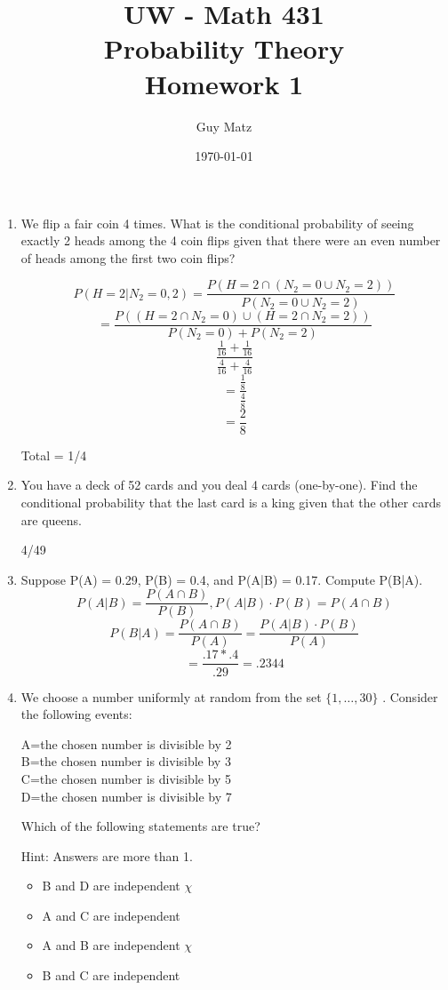 \documentclass[10pt]{article}
\title{UW - Math 431 \\
Probability Theory \\
Homework 1}
\author{Guy Matz}
\date{\today}
\begin{document}
\begin{enumerate}

  \item We flip a fair coin 4 times. What is the conditional probability of seeing exactly 2 heads among the 4 coin flips given that there were an even number of heads among the first two coin flips?

  \[ P(H=2 | N_2 = {0,2}) = \frac{P(H=2 \cap (N_2 = 0 \cup N_2 = 2))}{P(N_2 = 0 \cup N_2 = 2)} \]
  \[  = \frac{P((H=2 \cap N_2 = 0) \cup (H=2 \cap N_2 = 2))}{P(N_2 = 0) + P(N_2 = 2)} \]
  \[ \frac{ \frac{1}{16} + \frac{1}{16} }{ \frac{4}{16} + \frac{4}{16} }  \]
  \[ = \frac{ \frac{1}{8} }{ \frac{4}{8} }  \]
  \[ = \frac{2}{8} \]

  Total = 1/4

\newpage
  \item You have a deck of 52 cards and you deal 4 cards (one-by-one). Find the conditional probability that the last card is a king given that the other cards are queens.

    4/49

\newpage
  \item Suppose P(A) = 0.29, P(B) = 0.4, and P(A|B) = 0.17. Compute P(B|A).
    \[ P(A|B) = \frac{P(A \cap B)}{P(B)},  P(A|B)\cdot P(B) = P(A \cap B)\]
    \[ P(B|A) = \frac{P(A \cap B)}{P(A)} = \frac{P(A|B) \cdot P(B)}{P(A)}\]
    \[ = \frac{.17 * .4}{.29} = .2344 \]
\newpage
\item We choose a number uniformly at random from the set
  $\{1, \dots, 30\}$
. Consider the following events:

A={the chosen number is divisible by 2} \\
B={the chosen number is divisible by 3} \\
C={the chosen number is divisible by 5} \\
D={the chosen number is divisible by 7}

Which of the following statements are true?

Hint: Answers are more than 1.

  \begin{itemize}
    \item B and D are independent $\chi$
    \item A and C are independent \checkmark
    \item A and B are independent $\chi$
    \item B and C are independent \checkmark
  \end{itemize}
 

\end{enumerate}
\end{document}
